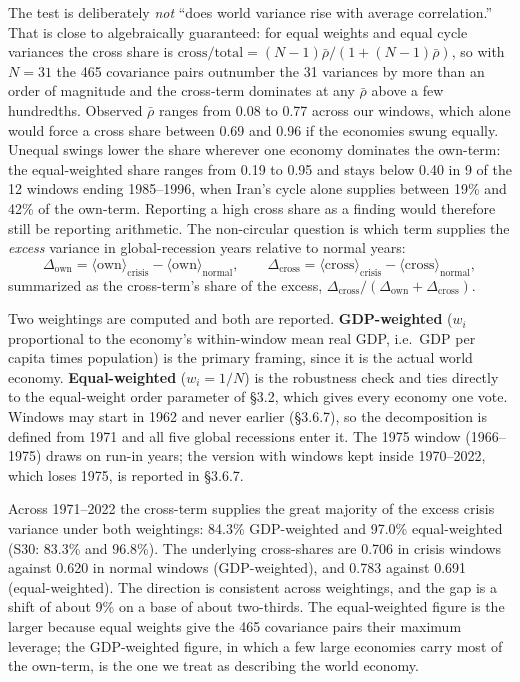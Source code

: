 \documentclass[11pt,a4paper]{article}
\begin{document}
The test is deliberately \emph{not} ``does world variance rise with average correlation.'' That is close to algebraically guaranteed: for equal weights and equal cycle variances the cross share is \(\mathrm{cross}/\mathrm{total} = (N-1)\bar\rho / (1 + (N-1)\bar\rho)\), so with \(N = 31\) the 465 covariance pairs outnumber the 31 variances by more than an order of magnitude and the cross-term dominates at any \(\bar\rho\) above a few hundredths. Observed \(\bar\rho\) ranges from 0.08 to 0.77 across our windows, which alone would force a cross share between 0.69 and 0.96 if the economies swung equally. Unequal swings lower the share wherever one economy dominates the own-term: the equal-weighted share ranges from 0.19 to 0.95 and stays below 0.40 in 9 of the 12 windows ending 1985–1996, when Iran's cycle alone supplies between 19\% and 42\% of the own-term. Reporting a high cross share as a finding would therefore still be reporting arithmetic. The non-circular question is which term supplies the \emph{excess} variance in global-recession years relative to normal years: \[\Delta_{\text{own}} = \langle \text{own}\rangle_{\mathrm{crisis}} - \langle \text{own}\rangle_{\mathrm{normal}}, \qquad \Delta_{\text{cross}} = \langle \text{cross}\rangle_{\mathrm{crisis}} - \langle \text{cross}\rangle_{\mathrm{normal}},\] summarized as the cross-term's share of the excess, \(\Delta_{\text{cross}} / (\Delta_{\text{own}} + \Delta_{\text{cross}})\).

Two weightings are computed and both are reported. \textbf{GDP-weighted} (\(w_i\) proportional to the economy's within-window mean real GDP, i.e.~GDP per capita times population) is the primary framing, since it is the actual world economy. \textbf{Equal-weighted} (\(w_i = 1/N\)) is the robustness check and ties directly to the equal-weight order parameter of §3.2, which gives every economy one vote. Windows may start in 1962 and never earlier (§3.6.7), so the decomposition is defined from 1971 and all five global recessions enter it. The 1975 window (1966–1975) draws on run-in years; the version with windows kept inside 1970–2022, which loses 1975, is reported in §3.6.7.

Across 1971–2022 the cross-term supplies the great majority of the excess crisis variance under both weightings: 84.3\% GDP-weighted and 97.0\% equal-weighted (S30: 83.3\% and 96.8\%). The underlying cross-shares are 0.706 in crisis windows against 0.620 in normal windows (GDP-weighted), and 0.783 against 0.691 (equal-weighted). The direction is consistent across weightings, and the gap is a shift of about 9\% on a base of about two-thirds. The equal-weighted figure is the larger because equal weights give the 465 covariance pairs their maximum leverage; the GDP-weighted figure, in which a few large economies carry most of the own-term, is the one we treat as describing the world economy.
\end{document}
